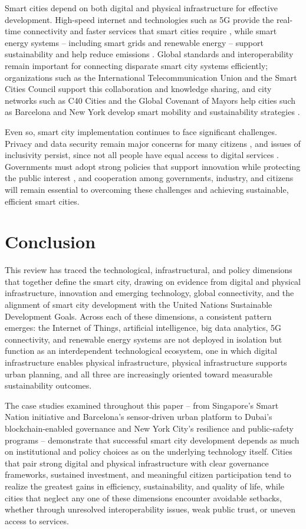 \documentclass[journal]{IEEEtran}
\begin{document}
Smart cities depend on both digital and physical infrastructure for effective development. High-speed internet and technologies such as 5G provide the real-time connectivity and faster services that smart cities require \cite{r97}, while smart energy systems -- including smart grids and renewable energy -- support sustainability and help reduce emissions \cite{r98}. Global standards and interoperability remain important for connecting disparate smart city systems efficiently; organizations such as the International Telecommunication Union and the Smart Cities Council support this collaboration and knowledge sharing, and city networks such as C40 Cities and the Global Covenant of Mayors help cities such as Barcelona and New York develop smart mobility and sustainability strategies \cite{r86,r94}.

Even so, smart city implementation continues to face significant challenges. Privacy and data security remain major concerns for many citizens \cite{r100}, and issues of inclusivity persist, since not all people have equal access to digital services \cite{r101}. Governments must adopt strong policies that support innovation while protecting the public interest \cite{r30}, and cooperation among governments, industry, and citizens will remain essential to overcoming these challenges and achieving sustainable, efficient smart cities.

\section{Conclusion}
This review has traced the technological, infrastructural, and policy dimensions that together define the smart city, drawing on evidence from digital and physical infrastructure, innovation and emerging technology, global connectivity, and the alignment of smart city development with the United Nations Sustainable Development Goals. Across each of these dimensions, a consistent pattern emerges: the Internet of Things, artificial intelligence, big data analytics, 5G connectivity, and renewable energy systems are not deployed in isolation but function as an interdependent technological ecosystem, one in which digital infrastructure enables physical infrastructure, physical infrastructure supports urban planning, and all three are increasingly oriented toward measurable sustainability outcomes.

The case studies examined throughout this paper -- from Singapore's Smart Nation initiative and Barcelona's sensor-driven urban platform to Dubai's blockchain-enabled governance and New York City's resilience and public-safety programs -- demonstrate that successful smart city development depends as much on institutional and policy choices as on the underlying technology itself. Cities that pair strong digital and physical infrastructure with clear governance frameworks, sustained investment, and meaningful citizen participation tend to realize the greatest gains in efficiency, sustainability, and quality of life, while cities that neglect any one of these dimensions encounter avoidable setbacks, whether through unresolved interoperability issues, weak public trust, or uneven access to services.
\end{document}
